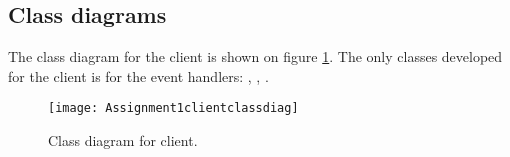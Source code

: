 \documentclass[Main]{subfiles}
\begin{document}
\subsection{Class diagrams}

The class diagram for the client is shown on figure \ref{fig:clientuml}. The only classes developed for the client is for the event handlers:  , , .

\begin{figure}[hbtp]
\centering
\texttt{[image: Assignment1clientclassdiag]}
\caption{Class diagram for client.}
\label{fig:clientuml}
\end{figure}
\end{document}
